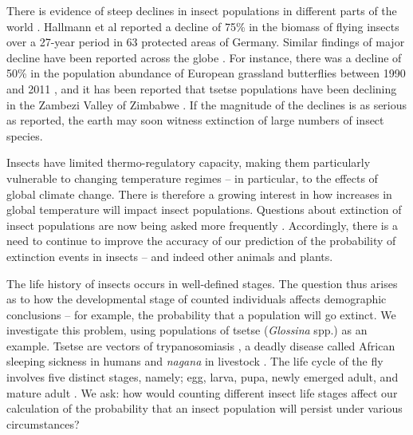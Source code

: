 \documentclass[smallextended]{svjour3}
\begin{document}
There is evidence of steep declines in insect populations in different parts of the world \cite{Conrad2002,Potts2010,Ilyinykh2011,VanSwaay2013,Lister2018}. Hallmann et al \cite{Hallmann2017} reported a decline of 75\% in the biomass of flying insects over a 27-year period in 63 protected areas of Germany. Similar findings of major decline have been reported across the globe \cite{Habel2015,Pelton2019}. For instance, there was a decline of 50\% in the population abundance of European grassland butterflies between 1990 and 2011 \cite{VanSwaay2013}, and it has been reported that tsetse populations have been declining in the Zambezi Valley of Zimbabwe \cite{Lord2018}. If the magnitude of the declines is as serious as reported, the earth may soon witness extinction of large numbers of insect species. 

Insects have limited thermo-regulatory capacity, making them particularly vulnerable to changing temperature regimes – in particular, to the effects of global climate change. There is therefore a growing interest in how increases in global temperature will impact insect populations. Questions about extinction of insect populations are now being asked more frequently \cite{Nilsson2017}. Accordingly, there is a need to continue to improve the accuracy of our prediction of the probability of extinction events in insects – and indeed other animals and plants. 

The life history of insects occurs in well-defined stages. The question thus arises as to how the developmental stage of counted individuals affects demographic conclusions – for example, the probability that a population will go extinct.  We investigate this problem, using populations of tsetse (\textit{Glossina} spp.) as an example. Tsetse are vectors of trypanosomiasis \cite{Wamwiri2016,Kioy2004}, a deadly disease called African sleeping sickness in humans and \textit{nagana} in livestock \cite{Kioy2004}. The life cycle of the fly involves five distinct stages, namely; egg, larva, pupa, newly emerged adult, and mature adult \cite{Ackley2017a}. We ask: how would counting different insect life stages affect our calculation of the probability that an insect population will persist under various circumstances? 
\end{document}
